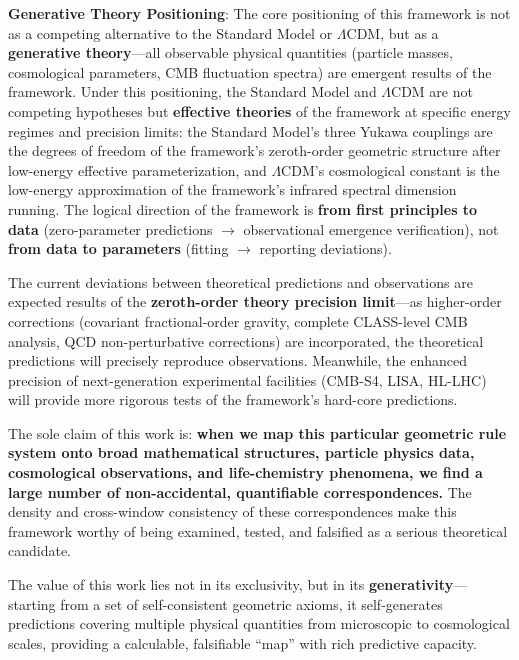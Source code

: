 \documentclass[12pt,a4paper,twocolumn]{article}
\begin{document}
\textbf{Generative Theory Positioning}: The core positioning of this framework is not as a competing alternative to the Standard Model or $\Lambda$CDM, but as a \textbf{generative theory}---all observable physical quantities (particle masses, cosmological parameters, CMB fluctuation spectra) are emergent results of the framework. Under this positioning, the Standard Model and $\Lambda$CDM are not competing hypotheses but \textbf{effective theories} of the framework at specific energy regimes and precision limits: the Standard Model's three Yukawa couplings are the degrees of freedom of the framework's zeroth-order geometric structure after low-energy effective parameterization, and $\Lambda$CDM's cosmological constant is the low-energy approximation of the framework's infrared spectral dimension running. The logical direction of the framework is \textbf{from first principles to data} (zero-parameter predictions $\to$ observational emergence verification), not \textbf{from data to parameters} (fitting $\to$ reporting deviations).

The current deviations between theoretical predictions and observations are expected results of the \textbf{zeroth-order theory precision limit}---as higher-order corrections (covariant fractional-order gravity, complete CLASS-level CMB analysis, QCD non-perturbative corrections) are incorporated, the theoretical predictions will precisely reproduce observations. Meanwhile, the enhanced precision of next-generation experimental facilities (CMB-S4, LISA, HL-LHC) will provide more rigorous tests of the framework's hard-core predictions.

The sole claim of this work is: \textbf{when we map this particular geometric rule system onto broad mathematical structures, particle physics data, cosmological observations, and life-chemistry phenomena, we find a large number of non-accidental, quantifiable correspondences.} The density and cross-window consistency of these correspondences make this framework worthy of being examined, tested, and falsified as a serious theoretical candidate.

The value of this work lies not in its exclusivity, but in its \textbf{generativity}---starting from a set of self-consistent geometric axioms, it self-generates predictions covering multiple physical quantities from microscopic to cosmological scales, providing a calculable, falsifiable ``map'' with rich predictive capacity.

\vspace{1em}
\end{document}
